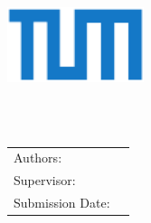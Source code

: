 \begin{titlepage}
  \centering

  \vspace{40mm}
  \includegraphics[width=40mm]{logos/tum}

  \vspace{5mm}
  {\huge\MakeUppercase{\getFaculty{}}}\\

  \vspace{5mm}
  {\large\MakeUppercase{\getUniversity{}}}\\

  \vspace{20mm}
  {\Large \getDoctype{}}

  \vspace{15mm}
  {\huge\bfseries \getTitle{}}

  \vspace{10mm}

  \vspace{15mm}
  \begin{tabular}{l l}
    Authors: & \getAuthor{} \\
    Supervisor: & \getSupervisor{} \\
    Submission Date: & \getSubmissionDate{} \\
  \end{tabular}

  \vspace{20mm}
\end{titlepage}
